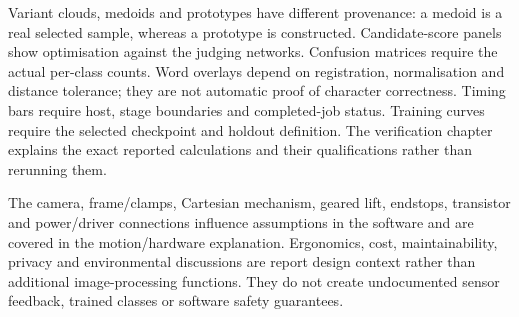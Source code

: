 Variant clouds, medoids and prototypes have different provenance: a medoid
is a real selected sample, whereas a prototype is constructed. Candidate-score
panels show optimisation against the judging networks. Confusion matrices
require the actual per-class counts. Word overlays depend on registration,
normalisation and distance tolerance; they are not automatic proof of
character correctness. Timing bars require host, stage boundaries and
completed-job status. Training curves require the selected checkpoint and
holdout definition. The verification chapter explains the exact reported
calculations and their qualifications rather than rerunning them.

The camera, frame/clamps, Cartesian mechanism, geared lift, endstops, transistor
and power/driver connections influence assumptions in the software and are
covered in the motion/hardware explanation. Ergonomics, cost, maintainability,
privacy and environmental discussions are report design context rather than
additional image-processing functions. They do not create undocumented
sensor feedback, trained classes or software safety guarantees.
